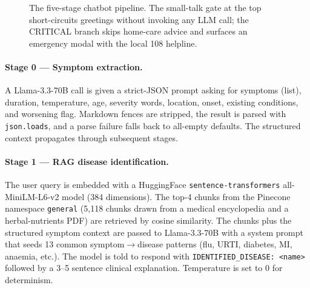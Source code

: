 \documentclass[12pt]{caltech_thesis}
\begin{document}
\begin{figure}[H]
{}%
    \caption{The five-stage chatbot pipeline. The small-talk gate at the
    top short-circuits greetings without invoking any LLM call; the
    CRITICAL branch skips home-care advice and surfaces an emergency
    modal with the local 108 helpline.}
    \label{fig:rag}
\end{figure}

\paragraph{Stage 0 --- Symptom extraction.} A Llama-3.3-70B call is given a
strict-JSON prompt asking for symptoms (list), duration, temperature, age,
severity words, location, onset, existing conditions, and worsening flag.
Markdown fences are stripped, the result is parsed with \texttt{json.loads},
and a parse failure falls back to all-empty defaults. The structured
context propagates through subsequent stages.

\paragraph{Stage 1 --- RAG disease identification.} The user query is
embedded with a HuggingFace \texttt{sentence-transformers} all-MiniLM-L6-v2
model (384 dimensions). The top-4 chunks from the Pinecone namespace
\texttt{general} (5{,}118 chunks drawn from a medical encyclopedia and a
herbal-nutrients PDF) are retrieved by cosine similarity. The chunks plus
the structured symptom context are passed to Llama-3.3-70B with a system
prompt that seeds 13 common symptom$\to$disease patterns (flu, URTI,
diabetes, MI, anaemia, etc.). The model is told to respond with
\texttt{IDENTIFIED\_DISEASE: <name>} followed by a 3--5 sentence clinical
explanation. Temperature is set to 0 for determinism.
\end{document}
